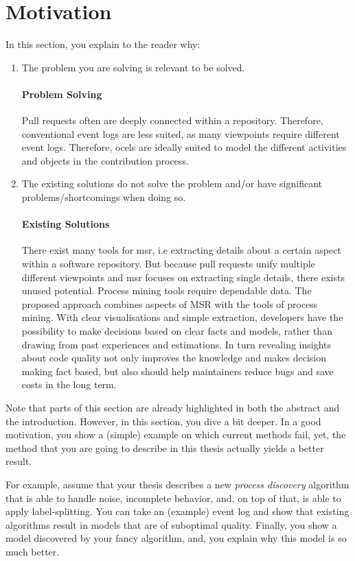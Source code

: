 \section{Motivation}
\label{sec:intro_ssec:motiv}

In this section, you explain to the reader why:
\begin{enumerate}
	\item The problem you are solving is relevant to be solved.
	\paragraph{Problem Solving} Pull requests often are deeply connected within a repository. Therefore, conventional event logs are less suited, as many viewpoints require different event logs. Therefore, \acp{ocel} are ideally suited to model the different activities and objects in the contribution process. 
	\item The existing solutions do not solve the problem and/or have significant problems/shortcomings when doing so.
	\paragraph{Existing Solutions} There exist many tools for \ac{msr}, i.e extracting details about a certain aspect within a software repository. But because pull requests unify multiple different viewpoints and \ac{msr} focuses on extracting single details, there exists unused potential. Process mining tools require dependable data. The proposed approach combines aspects of \ac{MSR} with the tools of process mining. With clear visualisations and simple extraction, developers have the possibility to make decisions based on clear facts and models, rather than drawing from past experiences and estimations. In turn revealing insights about code quality not only improves the knowledge and makes decision making fact based, but also should help maintainers reduce bugs and save costs in the long term. 
\end{enumerate}
Note that parts of this section are already highlighted in both the abstract and the introduction.
However, in this section, you dive a bit deeper.
In a good motivation, you show a (simple) example on which current methods fail, yet, the method that you are going to describe in this thesis actually yields a better result.

For example, assume that your thesis describes a new \emph{process discovery} algorithm that is able to handle noise, incomplete behavior, and, on top of that, is able to apply label-splitting.
You can take an (example) event log and show that existing algorithms result in models that are of suboptimal quality.
Finally, you show a model discovered by your fancy algorithm, and, you explain why this model is so much better.



